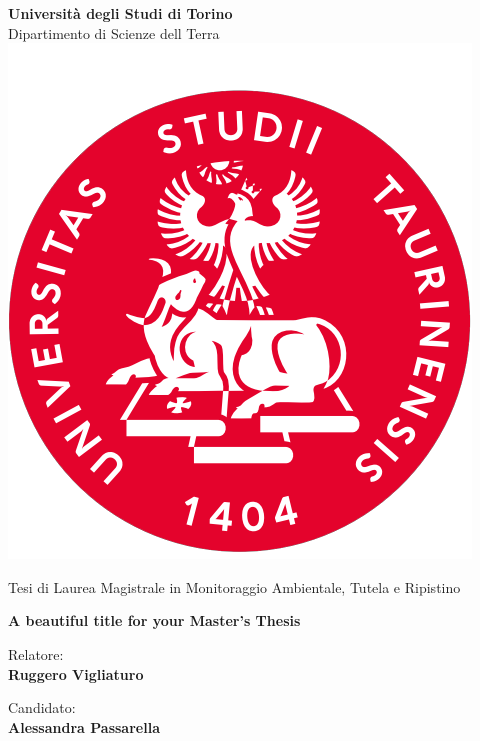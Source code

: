 \begin{titlepage}

\begin{center}
    \textbf{\huge{Università degli Studi di Torino}}
    \vspace{2mm}
    \\ \LARGE{Dipartimento di Scienze dell Terra}
    \vspace{5mm}
    \\ \includegraphics[keepaspectratio=true,scale=0.4]{images/unito_logo.png}
    \vspace{5mm}
\end{center}

\begin{center}
    \LARGE{Tesi di Laurea Magistrale in Monitoraggio Ambientale, Tutela e Ripistino} 
\end{center}

\vspace{15mm}
\begin{center}
    \textbf{\huge{ A beautiful title for your Master's Thesis }}
\end{center}
\vspace{30mm}

\begin{minipage}[t]{0.47\textwidth}
	{\large{Relatore:}{\normalsize\vspace{3mm}
	\bf\\ \large{Ruggero Vigliaturo} \normalsize\vspace{3mm}\bf}}
\end{minipage}
\hfill
\begin{minipage}[t]{0.47\textwidth}\raggedleft
	{\large{Candidato:}{\normalsize\vspace{3mm} \bf\\ \large{Alessandra Passarella}}}
\end{minipage}

\vspace{40 mm}
\hrulefill
\\ 

\end{titlepage}